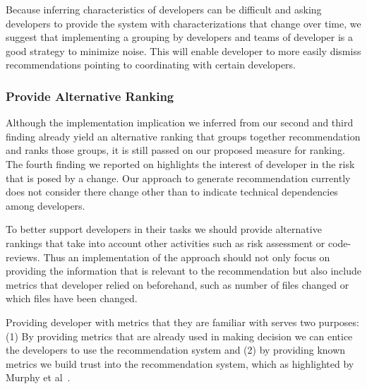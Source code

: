 Because inferring characteristics of developers can be difficult and asking developers to provide the system with characterizations that change over time, we suggest that implementing a grouping by developers and teams of developer is a good strategy to minimize noise.
This will enable developer to more easily dismiss recommendations pointing to coordinating with certain developers.
 

\subsubsection{Provide Alternative Ranking}
Although the implementation implication we inferred from our second and third finding already yield an alternative ranking that groups together recommendation and ranks those groups, it is still passed on our proposed measure for ranking.
The fourth finding we reported on highlights the interest of developer in the risk that is posed by a change.
Our approach to generate recommendation currently does not consider there change other than to indicate technical dependencies among developers.

To better support developers in their tasks we should provide alternative rankings that take into account other activities such as risk assessment or code-reviews.
Thus an implementation of the approach should not only focus on providing the information that is relevant to the recommendation but also include metrics that developer relied on beforehand, such as number of files changed or which files have been changed.

Providing developer with metrics that they are familiar with serves two purposes:
(1) By providing metrics that are already used in making decision we can entice the developers to use the recommendation system and
(2) by providing known metrics we build trust into the recommendation system, which as highlighted by Murphy et al~\cite{murphy:rsse:2010}.

